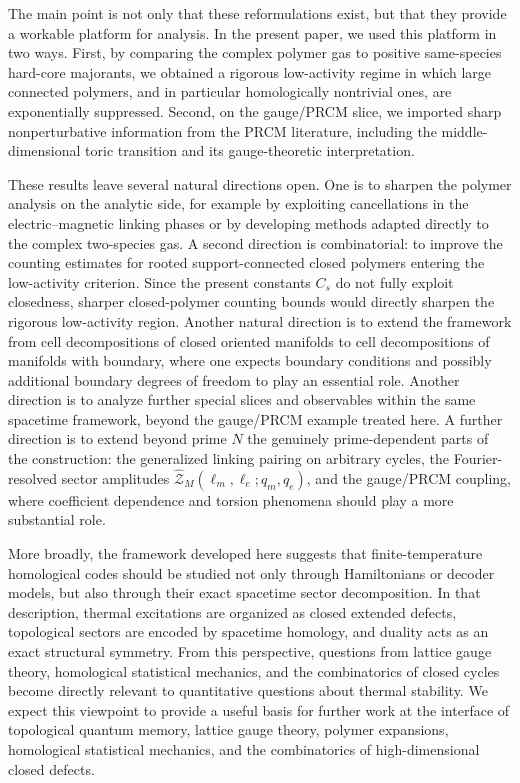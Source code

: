 \documentclass[dvipsnames,a4paper]{article}
\numberwithin{equation}{section}
\theoremstyle{definition}
\theoremstyle{remark}
\begin{document}
The main point is not only that these reformulations exist, but that they
provide a workable platform for analysis.  In the present paper, we used this
platform in two ways.  First, by comparing the complex polymer gas to positive
same-species hard-core majorants, we obtained a rigorous low-activity regime in
which large connected polymers, and in particular homologically nontrivial
ones, are exponentially suppressed.  Second, on the gauge/PRCM slice, we
imported sharp nonperturbative information from the PRCM literature, including
the middle-dimensional toric transition and its gauge-theoretic interpretation.

These results leave several natural directions open. One is to sharpen the polymer analysis on the analytic side, for example by exploiting cancellations in the electric--magnetic linking phases or by developing methods adapted directly to the complex two-species gas. A second direction is combinatorial: to improve the counting estimates for rooted support-connected closed polymers entering the low-activity criterion. Since the present constants \(C_s\) do not fully exploit closedness, sharper closed-polymer counting bounds would directly sharpen the rigorous low-activity region. Another natural direction is to extend the framework from cell decompositions of closed oriented manifolds to cell decompositions of manifolds with boundary, where one expects boundary conditions and possibly additional boundary degrees of freedom to play an essential role. Another direction is to analyze further special slices and observables within the same spacetime framework, beyond the gauge/PRCM example treated here. A further direction is to extend beyond prime \(N\) the genuinely prime-dependent parts of the construction: the generalized linking pairing on arbitrary cycles, the Fourier-resolved sector amplitudes \(\widehat{\mathcal Z}_M(\ell_m,\ell_e;q_m,q_e)\), and the gauge/PRCM coupling, where coefficient dependence and torsion phenomena should play a more substantial role.

More broadly, the framework developed here suggests that finite-temperature
homological codes should be studied not only through Hamiltonians or decoder
models, but also through their exact spacetime sector decomposition.  In that
description, thermal excitations are organized as closed extended defects,
topological sectors are encoded by spacetime homology, and duality acts as an
exact structural symmetry.  From this perspective, questions from lattice gauge
theory, homological statistical mechanics, and the combinatorics of closed
cycles become directly relevant to quantitative questions about thermal
stability.  We expect this viewpoint to provide a useful basis for further work
at the interface of topological quantum memory, lattice gauge theory, polymer
expansions, homological statistical mechanics, and the combinatorics of
high-dimensional closed defects.
\end{document}
